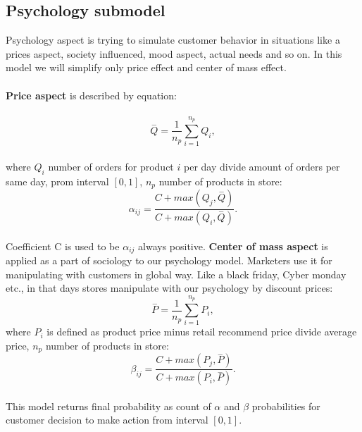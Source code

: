 \subsection{Psychology submodel} \label{subsec:model_psychology}
Psychology aspect is trying to simulate customer behavior in situations like a prices aspect, society influenced, mood aspect, actual needs and so on.
In this model we will simplify only price effect and center of mass effect.\\
\\
\textbf{Price aspect} \label{subsubsec:model_psychology_price} is described by equation:\\
\\
\begin{equation} \label{eq:15}
\overset{-}{Q} = \frac{1}{n_p} \sum_{i=1}^{n_p} Q_i,
\end{equation}
\\
where $Q_i$ number of orders for product $i$ per day divide amount of orders per same day, prom interval $[0,1]$, $n_p$ number of products in store:\\
\begin{equation} \label{eq:16}
\alpha_{ij} = \frac{C+max(Q_j, \overset{-}{Q})}{C+max(Q_i, \overset{-}{Q})}.
\end{equation}
\\
Coefficient C is used to be $\alpha_{ij}$ always positive.
\textbf{Center of mass aspect} \label{subsubsec:model_psychology_mass} is applied as a part of sociology to our psychology model.
Marketers use it for manipulating with customers in global way.
Like a black friday, Cyber monday etc., in that days stores manipulate with our psychology by discount prices:
\\
\begin{equation} \label{eq:17}
\overset{-}{P} = \frac{1}{n_p} \sum_{i=1}^{n_p} P_i,
\end{equation}
where $P_i$ is defined as product price minus retail recommend price divide average price, $n_p$ number of products in store:\\
\begin{equation} \label{eq:18}
\beta_{ij} = \frac{C+max(P_j, \overset{-}{P})}{C+max(P_i, \overset{-}{P})}.
\end{equation}
\\
This model returns final probability as count of $\alpha$ and $\beta$ probabilities for customer decision to make action from interval $[0,1]$.
\\
